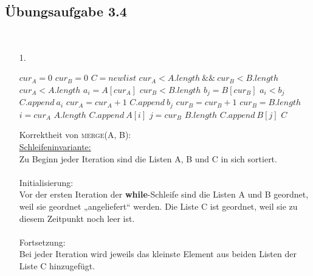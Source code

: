 \documentclass{article}
\begin{document}
\subsection{Übungsaufgabe 3.4}
\begin{flushright}
\begin{Large}
[~~~~\string| ~~8~]
\end{Large}
\end{flushright}
\vspace{1cm}\-\\
\begin{enumerate}
    \item[1.] \phantom{}\hspace{0.00mm}\\
    \begin{codebox}
        \li $cur_A = 0$
		\li $cur_B = 0$
		\li $C = newlist$
		\li \While $cur_A < A.length ~\&\&~ cur_B < B.length$
		\Indentmore
		    \li \If $cur_A < A.length$
		    \Indentmore
	    		\li $a_i = A[cur_A]$
	    		\End
	    	\li \If $cur_B < B.length$
	    	\Indentmore
    			\li $b_j = B[cur_B]$
    			\End
			\li \If $a_i < b_j$
			\Indentmore
			    \li $C.append~a_i$
			    \li $cur_A = cur_A + 1$
			    \li \Else
			    \li $C.append~b_j$
			    \li $cur_B = cur_B + 1$
			    \End
			\End
		\li \If $cur_B = B.length$
		\Indentmore
		    \li \For $i = cur_A$ \To $A.length$
		    \Indentmore
		        \li $C.append~A[i]$
		        \End
		    \li \Else %
    		\li \For $j = cur_B$ \To $B.length$
    		\Indentmore
    		    \li $C.append~B[j]$
    		    \End
    		\End
    	\li \Return $C$
	\end{codebox}
	Korrektheit von \textsc{merge(A, B)}:\\
    \underline{Schleifeninvariante:}\\
    Zu Beginn jeder Iteration sind die Listen A, B und C in sich sortiert.\\
    \\
    Initialisierung:\\
    Vor der ersten Iteration der \textbf{while}-Schleife sind die Listen A und B geordnet, weil sie geordnet „angeliefert“ werden. Die Liste C ist geordnet, weil sie zu diesem Zeitpunkt noch leer ist.\\
    \\
    Fortsetzung:\\
    Bei jeder Iteration wird jeweils das kleinste Element aus beiden Listen der Liste C hinzugefügt.

\end{enumerate}
\end{document}
